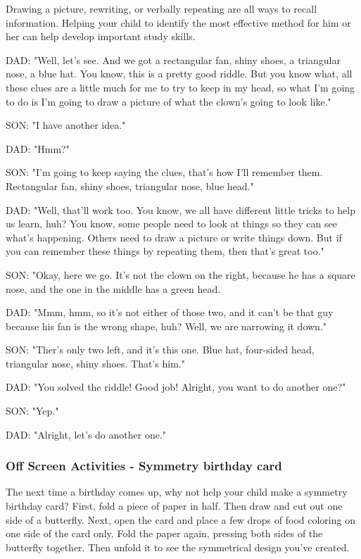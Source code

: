 Drawing a picture, rewriting, or verbally repeating are all ways to recall information.
Helping your child to identify the most effective method for him or her can help develop important study skills.

DAD: "Well, let's see. And we got a rectangular fan, shiny shoes, a triangular nose, a blue hat.
You know, this is a pretty good riddle.
But you know what, all these clues are a little much for me to try to keep in my head, so what I'm going to do is I'm going to draw a picture of what the clown's going to look like."

SON: "I have another idea."

DAD: "Hmm?"

SON: "I'm going to keep saying the clues, that's how I'll remember them.
Rectangular fan, shiny shoes, triangular nose, blue head."

DAD: "Well, that'll work too.
You know, we all have different little tricks to help us learn, huh?
You know, some people need to look at things so they can see what's happening.
Others need to draw a picture or write things down.
But if you can remember these things by repeating them, then that's great too."

SON: "Okay, here we go.
It's not the clown on the right, because he has a square nose, and the one in the middle has a green head.

DAD: "Mmm, hmm, so it's not either of those two, and it can't be that guy because his fan is the wrong shape, huh?
Well, we are narrowing it down."

SON: "Ther's only two left, and it's this one.
Blue hat, four-sided head, triangular nose, shiny shoes. That's him."

DAD: "You solved the riddle!
Good job!
Alright, you want to do another one?"

SON: "Yep."

DAD: "Alright, let's do another one."

\subsubsection{Off Screen Activities - Symmetry birthday card}

The next time a birthday comes up, why not help your child make a symmetry birthday card?
First, fold a piece of paper in half.
Then draw and cut out one side of a butterfly.
Next, open the card and place a few drops of food coloring on one side of the card only.
Fold the paper again, pressing both sides of the butterfly together.
Then unfold it to see the symmetrical design you've created.

